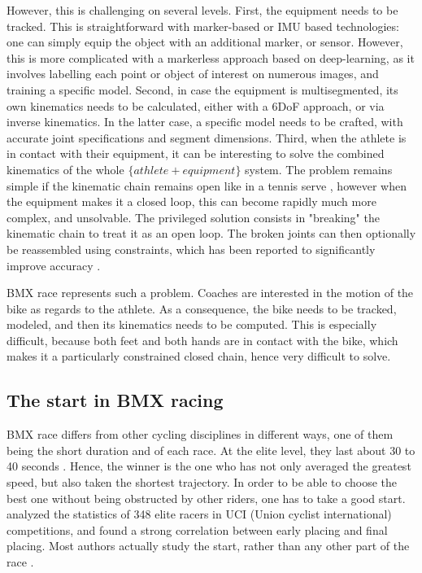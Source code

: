 However, this is challenging on several levels. First, the equipment needs to be tracked. This is straightforward with marker-based or IMU based technologies: one can simply equip the object with an additional marker, or sensor. However, this is more complicated with a markerless approach based on deep-learning, as it involves labelling each point or object of interest on numerous images, and training a specific model. Second, in case the equipment is multisegmented, its own kinematics needs to be calculated, either with a 6DoF approach, or via inverse kinematics. In the latter case, a specific model needs to be crafted, with accurate joint specifications and segment dimensions. Third, when the athlete is in contact with their equipment, it can be interesting to solve the combined kinematics of the whole $\{athlete+equipment\}$ system. The problem remains simple if the kinematic chain remains open like in a tennis serve \cite{Martin2013}, however when the equipment makes it a closed loop, this can become rapidly much more complex, and unsolvable. The privileged solution consists in "breaking" the kinematic chain to treat it as an open loop. The broken joints can then optionally be reassembled using constraints, which has been reported to significantly improve accuracy \cite{Rosenhahn2008,Fohanno2014}.

BMX race represents such a problem. Coaches are interested in the motion of the bike as regards to the athlete. As a consequence, the bike needs to be tracked, modeled, and then its kinematics needs to be computed. This is especially difficult, because both feet and both hands are in contact with the bike, which makes it a particularly constrained closed chain, hence very difficult to solve. 


\subsection{The start in BMX racing}
BMX race differs from other cycling disciplines in different ways, one of them being the short duration and of each race. At the elite level, they last about 30 to 40 seconds \cite{Cowell2012}. Hence, the winner is the one who has not only averaged the greatest speed, but also taken the shortest trajectory. In order to be able to choose the best one without being obstructed by other riders, one has to take a good start. \cite{Rylands2014} analyzed the statistics of 348 elite racers in UCI (Union cyclist international) competitions, and found a strong correlation between early placing and final placing. Most authors actually study the start, rather than any other part of the race \cite{Zabala2009,Gianikellis2011,Chiementin2012,Kalichova2013,Rylands2014}.

